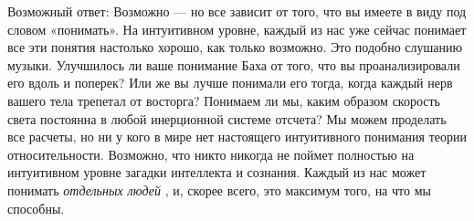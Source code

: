 \documentclass[../main.tex]{subfiles}
\begin{document}
Возможный ответ: Возможно --- но все зависит от того, что вы имеете в виду под словом «понимать». На интуитивном уровне, каждый из нас уже сейчас понимает все эти понятия настолько хорошо, как только возможно. Это подобно слушанию музыки. Улучшилось ли ваше понимание Баха от того, что вы проанализировали его вдоль и поперек? Или же вы лучше понимали его тогда, когда каждый нерв вашего тела трепетал от восторга? Понимаем ли мы, каким образом скорость света постоянна в любой инерционной системе отсчета? Мы можем проделать все расчеты, но ни у кого в мире нет настоящего интуитивного понимания теории относительности. Возможно, что никто никогда не поймет полностью на интуитивном уровне загадки интеллекта и сознания. Каждый из нас может понимать \emph{отдельных людей} , и, скорее всего, это максимум того, на что мы способны.
\end{document}
